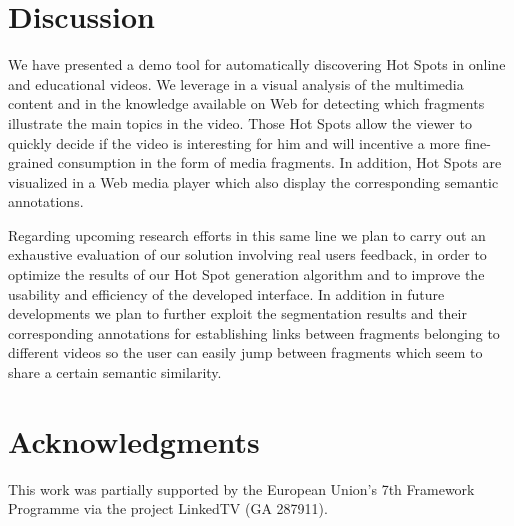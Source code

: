 \documentclass{llncs}
\begin{document}

\section{Discussion}
\label{sec:discussion}
We have presented a demo tool for automatically discovering Hot Spots in online and educational videos. We leverage in a visual analysis of the multimedia content and in the knowledge available on Web for detecting which fragments illustrate the main topics in the video. Those Hot Spots allow the viewer to quickly decide if the video is interesting for him and will incentive a more fine-grained consumption in the form of media fragments. In addition, Hot Spots are visualized in a Web media player which also display the corresponding semantic annotations.

Regarding upcoming research efforts in this same line  we plan to carry out an exhaustive evaluation of our solution involving real users feedback, in order to optimize the results of our Hot Spot generation algorithm and to improve the usability and efficiency of the developed interface. In addition in future developments we plan to further exploit the segmentation results and their corresponding annotations for establishing links between fragments belonging to different videos so the user can easily jump between fragments which seem to share a certain semantic similarity.


\section*{Acknowledgments}
This work was partially supported by the European Union's 7th Framework Programme via the project LinkedTV (GA 287911).



\end{document}
